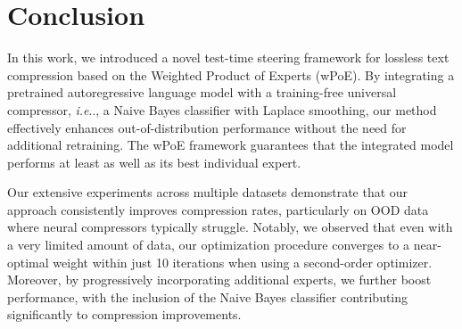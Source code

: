 \documentclass[11pt]{article}
\makeatletter
\DeclareRobustCommand\onedot{\futurelet\@let@token\@onedot}
\def\@onedot{\ifx\@let@token.\else.\null\fi\xspace}
\def\ie{\emph{i.e}\onedot} \def\Ie{\emph{I.e}\onedot}
\makeatother
\begin{document}
\begin{table}[!t]
  \centering
  \caption{Compression rates and alpha values on the \texttt{code} dataset using the Transformer 200K model pretrained on \texttt{enwik8}, evaluated under varying adaptation sample sizes.}
  \label{tab:stability}
  \small
\end{table}
\section{Conclusion}

In this work, we introduced a novel test-time steering framework for lossless text compression based on the Weighted Product of Experts (wPoE). By integrating a pretrained autoregressive language model with a training-free universal compressor, \ie, a Naive Bayes classifier with Laplace smoothing, our method effectively enhances out-of-distribution performance without the need for additional retraining. The wPoE framework guarantees that the integrated model performs at least as well as its best individual expert.

Our extensive experiments across multiple datasets demonstrate that our approach consistently improves compression rates, particularly on OOD data where neural compressors typically struggle. Notably, we observed that even with a very limited amount of data, our optimization procedure converges to a near-optimal weight within just 10 iterations when using a second-order optimizer.
Moreover, by progressively incorporating additional experts, we further boost performance, with the inclusion of the Naive Bayes classifier contributing significantly to compression improvements.
\end{document}
